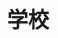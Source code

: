 \documentclass{article}
\begin{document}
\begin{CJK}{UTF8}{gbsn}
\section*{学校}


\end{CJK}	
\end{document}
